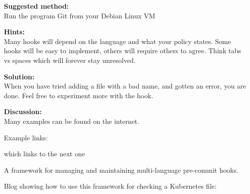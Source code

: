 \documentclass[a4paper,11pt,notitlepage]{report}
\begin{document}
{\bf Suggested method:}\\
Run the program Git from your Debian Linux VM


{\bf Hints:}\\
Many hooks will depend on the language and what your policy states. Some hooks will be easy to implement, others will require others to agree. Think tabs vs spaces which will forever stay unresolved.

{\bf Solution:}\\
When you have tried adding a file with a bad name, and gotten an error, you are done. Feel free to experiment more with the hook.

{\bf Discussion:}\\
Many examples can be found on the internet.

Example links:
\begin{list2}
\item {} which links to the next one
\item A framework for managing and maintaining multi-language pre-commit hooks.\\
\item Blog showing how to use this framework for checking a Kubernetes file:\\
\end{list2}
\end{document}
